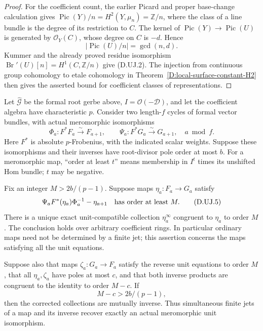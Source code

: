 \begin{proof}
For the coefficient count, the earlier Picard and proper
base-change calculation gives
$\operatorname{Pic}(Y)/n=H^2(Y,\mu_n)=\mathbb Z/n$,
where the class of a line bundle is the degree of its
restriction to $C$. The kernel of
$\operatorname{Pic}(Y)\to\operatorname{Pic}(U)$ is generated
by $\mathcal O_Y(C)$, whose degree on $C$ is $-d$.
Hence
\[
       |\operatorname{Pic}(U)/n|=\gcd(n,d).
\]
Kummer and the already proved residue isomorphism
$\operatorname{Br}'(U)[n]=H^1(C,\mathbb Z/n)$ give (D.UJ.2).
The injection from continuous group cohomology to etale
cohomology in Theorem~\ref{D:local-surface-constant-H2}
then gives the asserted bound for coefficient classes of
representations.
\end{proof}

\begin{lemma}
\label{D:meromorphic-unit-jet-contraction}
Let $\widehat{\mathcal G}$ be the formal root gerbe above,
$I=\mathcal O(-\mathcal D)$, and let the coefficient algebra
have characteristic $p$. Consider two length-$f$ cycles of
formal vector bundles, with actual meromorphic isomorphisms
\[
 \Phi_a:F^*F_a\xrightarrow{\sim}F_{a+1},\qquad
 \Psi_a:F^*G_a\xrightarrow{\sim}G_{a+1},\quad a\bmod f.
                                                               \tag{D.UJ.4}
\]
Here $F^*$ is absolute $p$-Frobenius, with the indicated
scalar weights. Suppose these isomorphisms and their
inverses have root-divisor pole order at most $b$.
For a meromorphic map, ``order at least $t$'' means membership
in $I^t$ times its unshifted Hom bundle; $t$ may be negative.

Fix an integer $M>2b/(p-1)$. Suppose maps $\eta_a:F_a\to G_a$
satisfy
\[
 \Psi_a F^*(\eta_a)\Phi_a^{-1}-\eta_{a+1}
                         \quad\hbox{has order at least }M.
                                                               \tag{D.UJ.5}
\]
There is a unique exact unit-compatible collection
$\eta_a^\infty$ congruent to $\eta_a$ to order $M$.
The conclusion holds over arbitrary coefficient rings.
In particular ordinary maps need not be determined by a
finite jet; this assertion concerns the maps satisfying
all the unit equations.

Suppose also that maps $\zeta_a:G_a\to F_a$ satisfy the
reverse unit equations to order $M$, that all $\eta_a,\zeta_a$
have poles at most $c$, and that both inverse products
are congruent to the identity to order $M-c$. If
\[
                       M-c>2b/(p-1),                  \tag{D.UJ.6}
\]
then the corrected collections are mutually inverse.
Thus simultaneous finite jets of a map and its inverse
recover exactly an actual meromorphic unit isomorphism.
\end{lemma}

